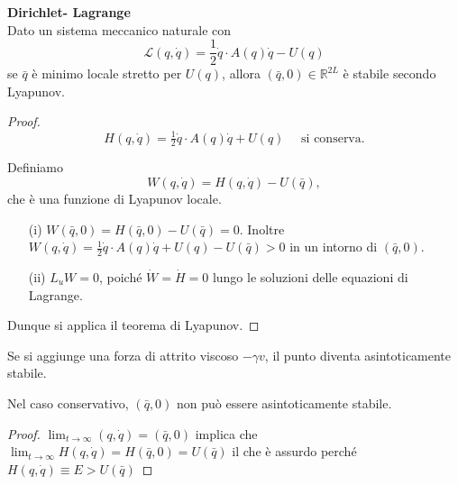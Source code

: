 \begin{theorem}
    \textbf{Dirichlet- Lagrange}\\
    Dato un sistema meccanico naturale con 
    \begin{equation}
        \mathcal{L}(q,\dot{q})=\frac{1}{2}\dot{q}\cdot A(q)\dot{q} - U(q)
    \end{equation}
    se $\bar{q}$ è minimo locale stretto per $U(q)$, allora $(\bar{q},0) \in \mathbb{R}^{2L}$ è stabile secondo Lyapunov.
\end{theorem}
\begin{proof}

\begin{equation}
    H(q,\dot{q}) = \tfrac{1}{2} \dot{q}\cdot A(q)\dot{q} + U(q) \quad \text{ si conserva.}
\end{equation}
  

Definiamo
\begin{equation}
    W(q,\dot{q}) = H(q,\dot{q}) - U(\bar{q}),
\end{equation}
che è una funzione di Lyapunov locale.  

\begin{itemize}
    \item[(i)] $W(\bar{q},0) = H(\bar{q},0) - U(\bar{q}) = 0$.  
    Inoltre  $
        W(q,\dot{q}) = \tfrac{1}{2}\dot{q}\cdot A(q)\dot{q} + U(q) - U(\bar{q}) > 0
    $
    in un intorno di $(\bar{q},0)$.  

    \item[(ii)] $L_u W = 0$, poiché $\dot{W} = \dot{H} = 0$ lungo le soluzioni delle equazioni di Lagrange.  
\end{itemize}

Dunque si applica il teorema di Lyapunov.  

\end{proof}

\begin{remark}
    Se si aggiunge una forza di attrito viscoso $-\gamma v$, il punto diventa asintoticamente stabile.
\end{remark}
\begin{remark}
    Nel caso conservativo, $(\bar{q},0)$ non può essere asintoticamente stabile.
\end{remark}
\begin{proof}
    $\lim_{t\rightarrow\infty}(q,\dot{q})= (\bar{q},0)$ implica che $\lim_{t\rightarrow\infty}H(q,\dot{q})= H(\bar{q},0)= U(\bar{q})$ 
    il che è assurdo perché $H(q,\dot{q})\equiv E >U(\bar{q})$
\end{proof}

